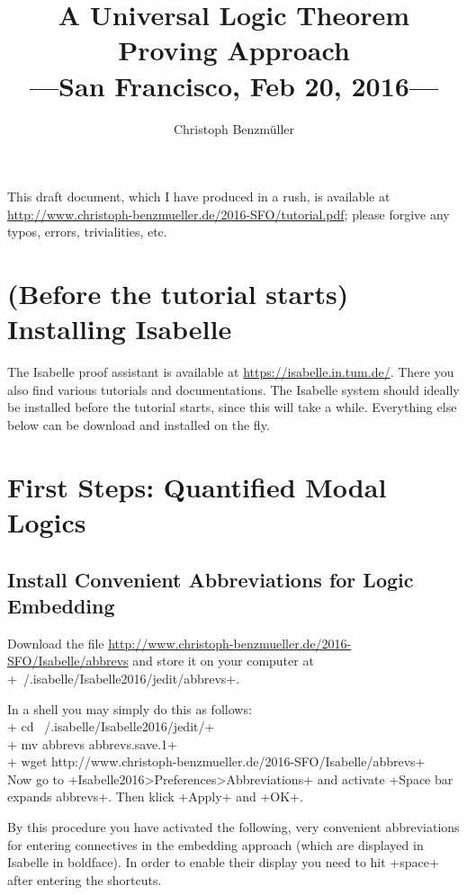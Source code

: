\documentclass{article}
\title{A Universal Logic Theorem Proving Approach \\ \large ---San Francisco, Feb 20,
  2016---}
\author{Christoph Benzm\"uller}
\date{}
\begin{document}
\maketitle

This draft document, which I have produced in a rush, is available at
\href{http://www.christoph-benzmueller.de/2016-SFO/tutorial.pdf}{http://www.christoph-benzmueller.de/2016-SFO/tutorial.pdf};
please forgive any 
typos, errors, trivialities, etc. 

\section{(Before the tutorial starts) Installing Isabelle}
The Isabelle proof assistant is available at
\href{https://isabelle.in.tum.de/}{https://isabelle.in.tum.de/}.
There you also find various tutorials and documentations. The Isabelle
system should ideally be installed before the tutorial starts, since
this will take a while. Everything else below can be download and
installed on the fly.

\section{First Steps: Quantified Modal Logics}
\subsection{Install Convenient Abbreviations for Logic Embedding}
Download the file
\href{http://www.christoph-benzmueller.de/2016-SFO/Isabelle/abbrevs}{http://www.christoph-benzmueller.de/2016-SFO/Isabelle/abbrevs}
and store it on your computer at +~/.isabelle/Isabelle2016/jedit/abbrevs+.

In a shell you may simply do this as follows: \\[1em]
+ cd ~/.isabelle/Isabelle2016/jedit/+ \\
+ mv abbrevs abbrevs.save.1+\\
+ wget http://www.christoph-benzmueller.de/2016-SFO/Isabelle/abbrevs+
\\[1em]
Now go to +Isabelle2016>Preferences>Abbreviations+  
and activate +Space bar expands abbrevs+. Then klick +Apply+ and +OK+.

By this procedure you have activated the following, very convenient abbreviations for
entering connectives in the embedding approach (which are displayed in Isabelle in
boldface). In order to enable their display you need to
hit +space+ after entering the shortcuts.\\[1em]
\end{document}
